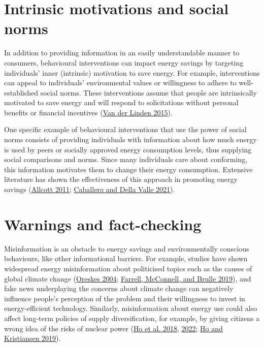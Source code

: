 \documentclass[
  11pt,
  captions=heading]{scrreport}
\begin{document}
\hypertarget{intrinsic-motivations-and-social-norms}{%
\section{Intrinsic motivations and social
norms}\label{intrinsic-motivations-and-social-norms}}

In addition to providing information in an easily understandable manner
to consumers, behavioural interventions can impact energy savings by
targeting individuals' inner (intrinsic) motivation to save energy. For
example, interventions can appeal to individuals' environmental values
or willingness to adhere to well-established social norms. These
interventions assume that people are intrinsically motivated to save
energy and will respond to solicitations without personal benefits or
financial incentives (\protect\hyperlink{ref-van2015social}{Van der
Linden 2015}).

One specific example of behavioural interventions that use the power of
social norms consists of providing individuals with information about
how much energy is used by peers or socially approved energy consumption
levels, thus supplying social comparisons and norms. Since many
individuals care about conforming, this information motivates them to
change their energy consumption. Extensive literature has shown the
effectiveness of this approach in promoting energy savings
(\protect\hyperlink{ref-allcott2011social}{Allcott 2011};
\protect\hyperlink{ref-caballero2021tackling}{Caballero and Della Valle
2021}).

\hypertarget{warnings-and-fact-checking}{%
\section{Warnings and fact-checking}\label{warnings-and-fact-checking}}

Misinformation is an obstacle to energy savings and environmentally
conscious behaviours, like other informational barriers. For example,
studies have shown widespread energy misinformation about politicised
topics such as the causes of global climate change
(\protect\hyperlink{ref-oreskes2004scientific}{Oreskes 2004};
\protect\hyperlink{ref-farrell2019evidence}{Farrell, McConnell, and
Brulle 2019}), and fake news underplaying the concerns about climate
change can negatively influence people's perception of the problem and
their willingness to invest in energy-efficient technology. Similarly,
misinformation about energy use could also affect long-term policies of
supply diversification, for example, by giving citizens a wrong idea of
the risks of nuclear power (\protect\hyperlink{ref-ho2018can}{Ho et al.
2018}, \protect\hyperlink{ref-ho2022fake}{2022};
\protect\hyperlink{ref-ho2019environmental}{Ho and Kristiansen 2019}).
\end{document}
